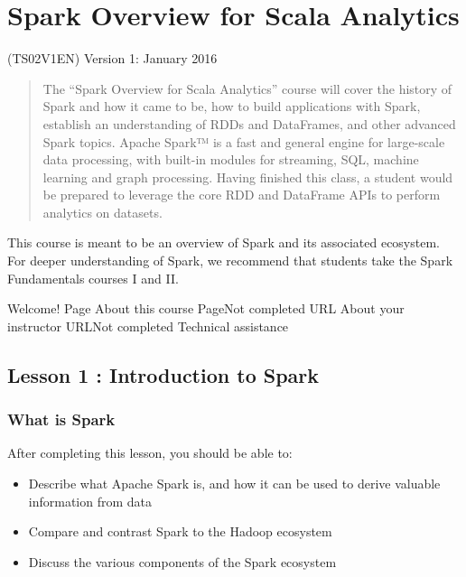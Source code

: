 
  
\chapter{Spark Overview for Scala Analytics}

(TS02V1EN) Version 1: January 2016

 

 \begin{quote}

The “Spark Overview for Scala Analytics” course will cover the history of Spark and how it came to be, how to build applications with Spark, establish an understanding of RDDs and DataFrames, and other advanced Spark topics. Apache Spark™ is a fast and general engine for large-scale data processing, with built-in modules for streaming, SQL, machine learning and graph processing. Having finished this class, a student would be prepared to leverage the core RDD and DataFrame APIs to perform analytics on datasets.
\end{quote}
This course is meant to be an overview of Spark and its associated ecosystem.  For deeper understanding of Spark, we recommend that students take the Spark Fundamentals courses I and II.
 

Welcome!
Page About this course PageNot completed
URL About your instructor URLNot completed
Technical assistance

\newpage

\section{Lesson 1 : Introduction to Spark}

\subsection{What is Spark}

After completing this lesson, you should be able to:

\begin{itemize}
\item Describe what Apache Spark is, and how it can be used to derive valuable information from data
\item Compare and contrast Spark to the Hadoop ecosystem
\item Discuss the various components of the Spark ecosystem
\end{itemize}

